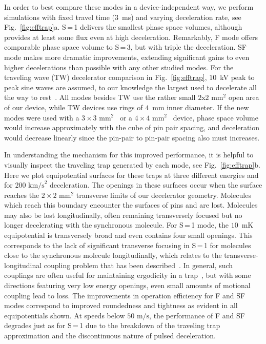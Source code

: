\documentclass[%
 reprint,
 amsmath,amssymb,
 aps,
prl,
]{revtex4-1}
\begin{document}
In order to best compare these modes in a device-independent way, we perform simulations with fixed travel time ($3$~ms) and varying deceleration rate, see Fig.~\ref{fig:efftrap}a.
S\,=\,1 delivers the smallest phase space volumes, although provides at least some flux even at high deceleration.
Remarkably, F mode offers comparable phase space volume to S\,=\,3, but with triple the deceleration.
SF mode makes more dramatic improvements, extending significant gains to even higher decelerations than possible with any other studied modes.
For the traveling wave (TW) decelerator comparison in Fig.~\ref{fig:efftrap}, $10$~kV peak to peak sine waves are assumed, to our knowledge the largest used to decelerate all the way to rest~\cite{Quintero-Perez2013}.
All modes besides TW use the rather small $2$x$2\text{ mm}^2$ open area of our device, while TW devices use rings of $4$~mm inner diameter.
If the new modes were used with a $3\times3\text{ mm}^2$~\cite{Scharfenberg2009} or a $4\times4\text{ mm}^2$~\cite{VandeMeerakker2005} device, phase space volume would increase approximately with the cube of pin pair spacing, and deceleration would decrease linearly since the pin-pair to pin-pair spacing also must increases.

In understanding the mechanism for this improved performance, it is helpful to visually inspect the traveling trap generated by each mode, see Fig.~\ref{fig:efftrap}b.
Here we plot equipotential surfaces for these traps at three different energies and for $200 \text{ km/s}^2$ deceleration.
The openings in these surfaces occur when the surface reaches the $2 \times 2\text{ mm}^2$ transverse limits of our decelerator geometry.
Molecules which reach this boundary encounter the surfaces of pins and are lost.
Molecules may also be lost longitudinally, often remaining transversely focused but no longer decelerating with the synchronous molecule.
For S\,=\,1 mode, the $10$~mK equipotential is transversely broad and even contains four small openings.
This corresponds to the lack of significant transverse focusing in S\,=\,1 for molecules close to the synchronous molecule longitudinally, which relates to the transverse-longitudinal coupling problem that has been described~\cite{VanDeMeerakker2006}.
In general, such couplings are often useful for maintaining ergodicity in a trap~\cite{Surkov1996}, but with some directions featuring very low energy openings, even small amounts of motional coupling lead to loss.
The improvements in operation efficiency for F and SF modes correspond to improved roundedness and tightness as evident in all equipotentials shown.
At speeds below $50\text{ m/s}$, the performance of F and SF degrades just as for S\,=\,1 due to the breakdown of the traveling trap approximation and the discontinuous nature of pulsed deceleration.
\end{document}
